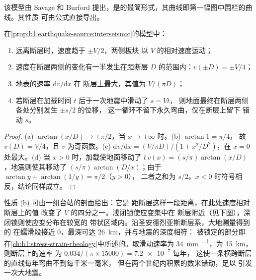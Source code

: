 该模型由 Savage 和 Burford 提出，是的最简形式，其曲线即第一幅图中围栏的曲线。其性质
可由公式直接导出。

\begin{proposition}[读取震间剖面]\label{prop:b1:earthquake-source:profile}
在\cref{prop:b1:earthquake-source:interseismic}的模型中：
\begin{enumerate}[label=(\alph*)]
  \item 远离断层时，速度趋于 $\pm V/2$，两侧板块
        以 $V$ 的相对速度运动；
  \item 速度在断层两侧的变化有一半发生在距断层
        $D$ 的范围内：$v(\pm D) = \pm V/4$；
  \item 地表的速率 $\mathrm dv/\mathrm dx$ 在
        断层上最大，其值为 $V/(\pi D)$；
  \item 若断层在加载时间 $t$ 后于一次地震中滑动了 $s = Vt$，
        则地面最终在断层两侧各处分别发生 $\pm s/2$ 的位移，
        这一循环不留下永久弯曲，仅在断层上留下
        错动 $s$。
\end{enumerate}
\end{proposition}

\begin{proof}
(a) $\arctan(x/D) \to \pm\pi/2$，当 $x \to \pm\infty$ 时。(b) $\arctan 1 = \pi/4$，
故 $v(D) = V/4$，且 $v$ 为奇函数。(c) $\mathrm dv/\mathrm dx = (V/\pi D)/(1 +
x^2/D^2)$，在 $x = 0$ 处最大。(d) 当 $x > 0$ 时，加载使地面移动了
$t\,v(x) = (s/\pi)\arctan(x/D)$，地震则使其移动了
$(s/\pi)\arctan(D/x)$；由于 $\arctan y + \arctan(1/y) = \pi/2$（$y > 0$），
二者之和为 $s/2$。$x < 0$ 时符号相反，结论同样成立。
\end{proof}

性质 (b) 可由一组台站的剖面给出：它是
距断层这样一段距离，在此处速度相对断层上的值
改变了 $V$ 的四分之一。浅闭锁使应变集中在
断层附近（见下图），深闭锁则使应变分布在较宽的
带状区域内。沿圣安德烈亚斯断层系，大地测量得到的
在蠕滑段接近 0，最深可达 \qty{26}{km}，并与地震的深度相符：
被锁定的部分即
在\cref{ch:b1:stress-strain-rheology}中所述的。取滑动速率为
\qty{34}{mm.^{-1}}，为 \qty{15}{km}，则断层上的速率
为 $\num{0.034}/(\pi\times\num{15000}) = \num{7.2e-7}$ 每年，
这使一条横跨断层的直线每年弯曲不到每千米一毫米，
但在两个世纪内积累的数米错动，足以
引发一次大地震。

